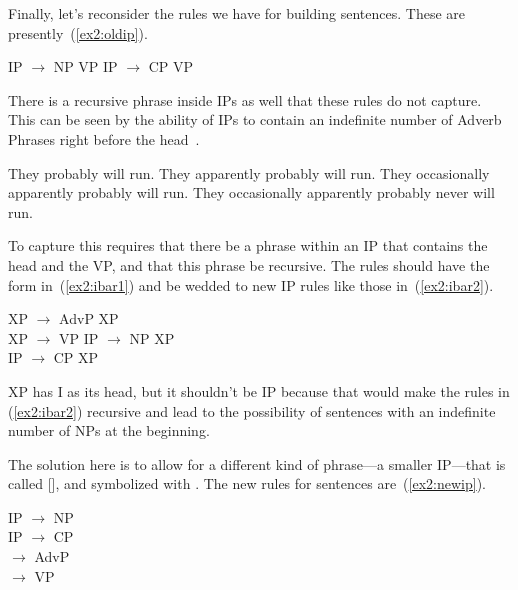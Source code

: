 Finally, let's reconsider the rules we have for building sentences. These are presently~(\ref{ex2:oldip}).
\begin{exe}
	\raggedright
	\ex \label{ex2:oldip} 
	\begin{xlist}
		\ex IP $\rightarrow$ NP  VP
		\ex IP $\rightarrow$ CP  VP
	\end{xlist}
\end{exe}
There is a recursive phrase inside IPs as well that these rules do not capture. This can be seen by the ability of IPs to contain an indefinite number of Adverb Phrases right before the head~.
\begin{exe}
	\raggedright
	\ex \label{ex2:advipr} 
	\begin{xlist}
		\ex They probably will run.
		\ex They apparently probably will run.
		\ex They occasionally apparently probably will run.
		\ex They occasionally apparently probably never will run. 
	\end{xlist}
\end{exe}
To capture this requires that there be a phrase within an IP that contains the head  and the VP, and that this phrase be recursive. The rules should have the form in~(\ref{ex2:ibar1}) and be wedded to new IP rules like those in~(\ref{ex2:ibar2}).
\begin{exe}
	\raggedright
	\ex \label{ex2:ibar1} 
	XP $\rightarrow$ AdvP XP\\ XP $\rightarrow$  VP
	\ex \label{ex2:ibar2}
	IP $\rightarrow$ NP XP\\ IP $\rightarrow$ CP XP
\end{exe}
XP has I as its head, but it shouldn't be IP because that would make the rules in (\ref{ex2:ibar2}) recursive and lead to the possibility of sentences with an indefinite number of NPs at the beginning.
\begin{exe}
	\raggedright
\end{exe}
The solution here is to allow for a different kind of phrase---a smaller IP---that is called [], and symbolized with . The new rules for sentences are~(\ref{ex2:newip}).
\begin{exe}
	\raggedright
	\ex \label{ex2:newip} 
	IP $\rightarrow$ NP \\ IP $\rightarrow$ CP \\
	 $\rightarrow$ AdvP \\  $\rightarrow$  VP
\end{exe}

